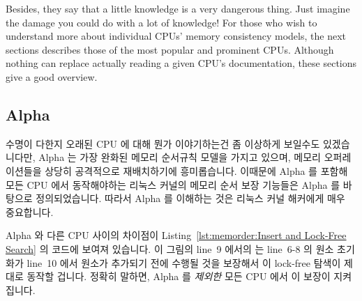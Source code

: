 Besides, they say that a little knowledge is a very dangerous thing.
Just imagine the damage you could do with a lot of knowledge!
For those who wish to understand more about individual CPUs'
memory consistency models, the next sections describes those of the
most popular and prominent CPUs.
Although nothing can replace actually reading a given CPU's documentation,
these sections give a good overview.
\fi

\subsection{Alpha}
\label{sec:memorder:Alpha}

수명이 다한지 오래된 CPU 에 대해 뭔가 이야기하는건 좀 이상하게 보일수도
있겠습니다만, Alpha 는 가장 완화된 메모리 순서규칙 모델을 가지고 있으며, 메모리
오퍼레이션들을 상당히 공격적으로 재배치하기에 흥미롭습니다.
이때문에 Alpha 를 포함해 모든 CPU 에서 동작해야하는 리눅스 커널의 메모리 순서
보장 기능들은 Alpha 를 바탕으로 정의되었습니다.
따라서 Alpha 를 이해하는 것은 리눅스 커널 해커에게 매우 중요합니다.

Alpha 와 다른 CPU 사이의 차이점이
Listing~\ref{lst:memorder:Insert and Lock-Free Search}
의 코드에 보여져 있습니다.
이 그림의 line~9 에서의  는 line~6-8 의 원소 초기화가 line~10
에서 원소가 추가되기 전에 수행될 것을 보장해서 이 lock-free 탐색이 제대로
동작할 겁니다.
정확히 말하면, Alpha 를 {\em 제외한} 모든 CPU 에서 이 보장이 지켜집니다.

